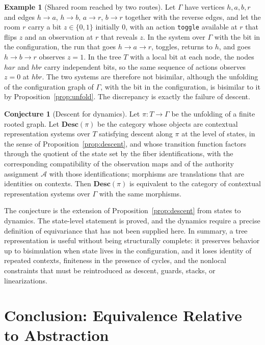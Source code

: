 \documentclass[11pt]{article}
\theoremstyle{definition}
\newtheorem{example}[theorem]{Example}
\newtheorem{conjecture}[theorem]{Conjecture}
\theoremstyle{remark}
\newcommand{\cA}{\mathcal A}
\begin{document}
\begin{example}[Shared room reached by two routes]\label{ex:sharedroom}
Let $\Gamma$ have vertices $h,a,b,r$ and edges $h\to a$, $h\to b$, $a\to r$, $b\to r$ together with the reverse edges, and let the room $r$ carry a bit $z\in\{0,1\}$ initially $0$, with an action \texttt{toggle} available at $r$ that flips $z$ and an observation at $r$ that reveals $z$. In the system over $\Gamma$ with the bit in the configuration, the run that goes $h\to a\to r$, toggles, returns to $h$, and goes $h\to b\to r$ observes $z=1$. In the tree $T$ with a local bit at each node, the nodes $har$ and $hbr$ carry independent bits, so the same sequence of actions observes $z=0$ at $hbr$. The two systems are therefore not bisimilar, although the unfolding of the configuration graph of $\Gamma$, with the bit in the configuration, is bisimilar to it by Proposition~\ref{prop:unfold}. The discrepancy is exactly the failure of descent.
\end{example}

\begin{conjecture}[Descent for dynamics]\label{conj:descent}
Let $\pi:T\to\Gamma$ be the unfolding of a finite rooted graph. Let $\mathbf{Desc}(\pi)$ be the category whose objects are contextual representation systems over $T$ satisfying descent along $\pi$ at the level of states, in the sense of Proposition~\ref{prop:descent}, and whose transition function factors through the quotient of the state set by the fiber identifications, with the corresponding compatibility of the observation maps and of the authority assignment $\cA$ with those identifications; morphisms are translations that are identities on contexts. Then $\mathbf{Desc}(\pi)$ is equivalent to the category of contextual representation systems over $\Gamma$ with the same morphisms.
\end{conjecture}

The conjecture is the extension of Proposition~\ref{prop:descent} from states to dynamics. The state-level statement is proved, and the dynamics require a precise definition of equivariance that has not been supplied here. In summary, a tree representation is useful without being structurally complete: it preserves behavior up to bisimulation when state lives in the configuration, and it loses identity of repeated contexts, finiteness in the presence of cycles, and the nonlocal constraints that must be reintroduced as descent, guards, stacks, or linearizations.

\section{Conclusion: Equivalence Relative to Abstraction}
\end{document}
